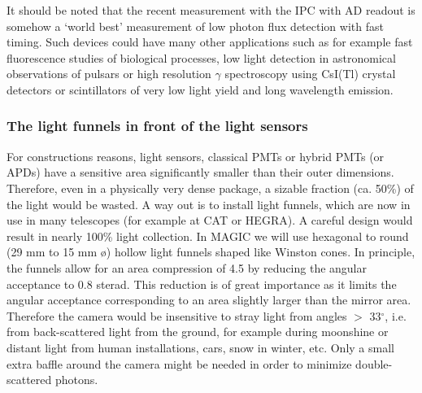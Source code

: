 It should be noted that the recent measurement with the IPC with AD readout
\cite{beaune:96} is somehow a `world best' measurement of low photon flux
detection with fast timing. Such devices could have many other applications
such as for example fast fluorescence studies of biological processes, low
light detection in astronomical observations of pulsars or high resolution 
$\gamma$ spectroscopy using CsI(Tl) crystal detectors or scintillators of very low
light yield and long wavelength emission.

%
%
%
%
%

\subsubsection{The light funnels in front of the light sensors}


\medskip For constructions reasons, light sensors, classical PMTs or hybrid
PMTs (or APDs) have a sensitive area significantly smaller than their outer
dimensions. Therefore, even in a physically very dense package, a sizable
fraction (ca. 50\%) of the light would be wasted. A way out is to install
light funnels, which are now in use in many telescopes (for example at CAT
or HEGRA). A careful design would result in nearly 100\% light collection.
In MAGIC we will use hexagonal to round (29 mm to 15 mm {\o}) hollow
light funnels shaped like Winston cones. In principle, the funnels allow for
an area compression of 4.5 by reducing the angular acceptance to 0.8 sterad.
This reduction is of great importance as it limits the angular acceptance
corresponding to an area slightly larger than the mirror area. Therefore the
camera would be insensitive to stray light from angles $>$ 33$^\circ$, i.e.
from back-scattered light from the ground, for example during moonshine or
distant light from human installations, cars, snow in winter, etc. Only a
small extra baffle around the camera might be needed in order to minimize
double-scattered photons.


